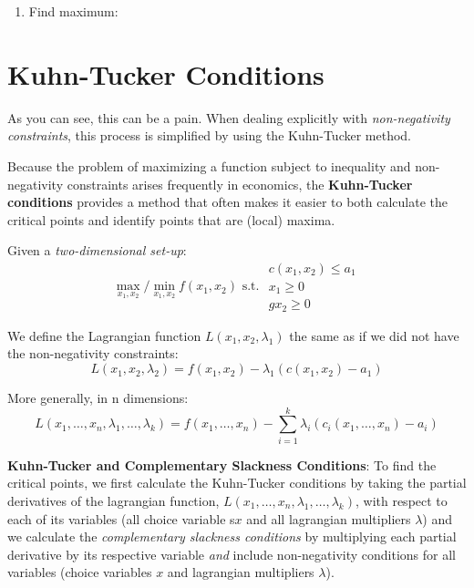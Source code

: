 \documentclass[
]{book}
\providecommand{\tightlist}{%
  \setlength{\itemsep}{0pt}\setlength{\parskip}{0pt}}
\theoremstyle{definition}
\theoremstyle{definition}
\theoremstyle{definition}
\theoremstyle{remark}
\begin{document}

\begin{enumerate}
\def\labelenumi{\arabic{enumi}.}
\setcounter{enumi}{4}
\tightlist
\item
  Find maximum: \phantom{Looking at the values of $f(x_1,x_2)$ at the critical points, we see that the constrained maximum is located at $(x_1, x_2) = (0,0)$, which is the same as the unconstrained max.  The constrained minimum is located at $(x_1, x_2) = (0,4)$, while there is no unconstrained minimum for this problem.}
\end{enumerate}

\hypertarget{kuhn-tucker-conditions}{%
\section{Kuhn-Tucker Conditions}\label{kuhn-tucker-conditions}}

As you can see, this can be a pain. When dealing explicitly with \emph{non-negativity constraints}, this process is simplified by using the Kuhn-Tucker method.

Because the problem of maximizing a function subject to inequality and non-negativity constraints arises frequently in economics, the \textbf{Kuhn-Tucker conditions} provides a method that often makes it easier to both calculate the critical points and identify points that are (local) maxima.

Given a \emph{two-dimensional set-up}:
\[\max_{x_1,x_2}/\min_{x_1,x_2} f(x_1,x_2) \text{ s.t. }
\begin{array}{l}
c(x_1,x_2) \le a_1\\
x_1 \ge 0 \\
gx_2 \ge 0
\end{array}\]

We define the Lagrangian function \(L(x_1,x_2,\lambda_1)\) the same as if we did not have the non-negativity constraints:
\[L(x_1,x_2,\lambda_2) = f(x_1,x_2) - \lambda_1(c(x_1,x_2) - a_1)\]

More generally, in n dimensions:
\[ L(x_1, \dots, x_n, \lambda_1, \dots, \lambda_k) = f(x_1, \dots, x_n) - \sum_{i=1}^k\lambda_i(c_i(x_1,\dots, x_n) - a_i)\]

\textbf{Kuhn-Tucker and Complementary Slackness Conditions}: To find the critical points, we first calculate the Kuhn-Tucker conditions by taking the partial derivatives of the lagrangian function, \(L(x_1,\dots,x_n,\lambda_1,\dots,\lambda_k)\), with respect to each of its variables (all choice variable s\(x\) and all lagrangian multipliers \(\lambda\)) and we calculate the \emph{complementary slackness conditions} by multiplying each partial derivative by its respective variable \emph{and} include non-negativity conditions for all variables (choice variables \(x\) and lagrangian multipliers \(\lambda\)).
\end{document}
